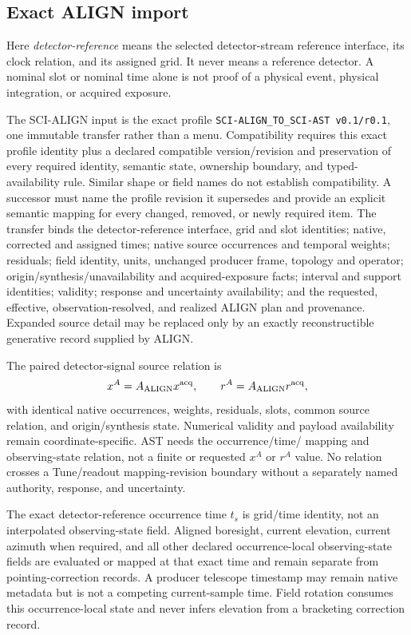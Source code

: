 \subsection{Exact ALIGN import}

Here \emph{detector-reference} means the selected detector-stream reference
interface, its clock relation, and its assigned grid.  It never means a
reference detector.  A nominal slot or nominal time alone is not proof of a
physical event, physical integration, or acquired exposure.

The SCI-ALIGN input is the exact profile
\nolinkurl{SCI-ALIGN_TO_SCI-AST v0.1/r0.1}, one immutable transfer rather than
a menu.  Compatibility requires this exact profile identity plus a declared
compatible version/revision and preservation of every required identity,
semantic state, ownership boundary, and typed-availability rule.  Similar
shape or field names do not establish compatibility.  A successor must name
the profile revision it supersedes and provide an explicit semantic mapping
for every changed, removed, or newly required item.  The transfer binds the
detector-reference interface, grid and slot identities; native, corrected and
assigned times; native source occurrences and temporal weights; residuals;
field identity, units, unchanged producer frame, topology and operator;
origin/synthesis/unavailability and acquired-exposure facts; interval and
support identities; validity; response and uncertainty availability; and the
requested, effective, observation-resolved, and realized ALIGN plan and
provenance.  Expanded source detail may be replaced only by an exactly
reconstructible generative record supplied by ALIGN.

The paired detector-signal source relation is
\begin{equation}
  x^A=A_{\rm ALIGN}x^{\rm acq},\qquad
  r^A=A_{\rm ALIGN}r^{\rm acq},
  \label{eq:paired-align}
\end{equation}
with identical native occurrences, weights, residuals, slots, common source
relation, and origin/synthesis state.  Numerical validity and payload
availability remain coordinate-specific.  AST needs the occurrence/time/
mapping and observing-state relation, not a finite or requested $x^A$ or
$r^A$ value.  No relation crosses a Tune/readout mapping-revision boundary
without a separately named authority, response, and uncertainty.

The exact detector-reference occurrence time \(t_s\) is grid/time identity,
not an interpolated observing-state field. Aligned boresight, current elevation,
current azimuth when required, and all other declared occurrence-local
observing-state fields are evaluated or mapped at that exact time and remain
separate from pointing-correction records. A producer telescope timestamp may
remain native metadata but is not a competing current-sample time. Field
rotation consumes this occurrence-local state and never infers elevation from
a bracketing correction record.

